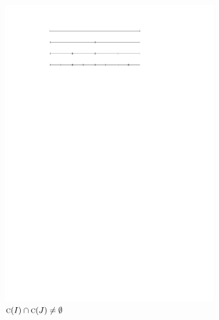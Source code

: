 \documentclass[english,gradu]{tktltiki2018}
\begin{document}
\begin{figure}\centering
	\begin{subfigure}[t]{0.32\textwidth}\centering
		\includegraphics[width=\textwidth,page=3]{fig/iproof}
		\caption{$\textsc{c}(I)\cap\textsc{c}(J)\neq\emptyset$}\label{fig:iproof:common}
	\end{subfigure}
	\hfil
	\begin{subfigure}[t]{0.32\textwidth}\centering

\end{subfigure}
\end{figure}
\end{document}
